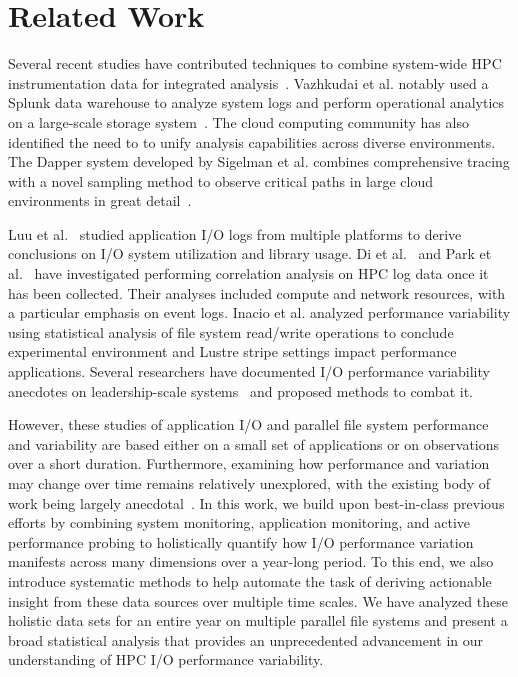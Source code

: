 \section{Related Work} \label{sec:related}

Several recent studies have contributed techniques to combine
system-wide HPC instrumentation data for integrated
analysis~\cite{Lockwood2017,Vazhkudai2017guide,Agelastos2014ldms,Kunkel2014siox,RIOT_2013}.
Vazhkudai et al. notably used a Splunk data warehouse to analyze system
logs and perform operational analytics on a large-scale storage system~\cite{Vazhkudai2017guide}.
The cloud computing community has also identified the need to to unify
analysis capabilities across diverse environments.
The Dapper system
developed by Sigelman et al. combines comprehensive tracing with a novel
sampling method to observe critical paths in large cloud environments in great
detail~\cite{Sigelman2010dapper}.

Luu et al.~\cite{Luu:2015:HPDC} studied application I/O logs from multiple platforms to derive conclusions on I/O system utilization and library usage.
Di et al.~\cite{7973730} and Park et al.~\cite{Park2017BigDM} have
investigated performing correlation analysis on HPC log data once it has been
collected.  Their analyses included compute and network resources, with a
particular emphasis on event logs. Inacio et al. analyzed performance variability using statistical analysis of file system read/write operations to conclude experimental environment and Lustre stripe settings impact performance applications. 
Several researchers have documented 
I/O performance variability anecdotes on leadership-scale
systems~\cite{Lofstead2010,Yildiz2016,carns2011understanding} and proposed
methods to combat it.  

However, these studies of application I/O and parallel file system performance and variability are based either on a small set of applications or on observations over a short duration.
Furthermore, examining how performance and variation may change over time remains relatively unexplored, with the existing body of work being largely anecdotal~\cite{Haryadi2018fail}.
In this work, we build upon best-in-class previous efforts by combining system monitoring, application monitoring, and active performance probing
to holistically quantify how I/O performance variation manifests across many dimensions over a year-long period.
To this end, we also introduce systematic methods to help automate the task of deriving actionable insight from these data sources over multiple time scales.
We have analyzed these holistic data sets for an entire year on multiple parallel file systems and present a broad statistical analysis that provides an unprecedented advancement in our understanding of HPC I/O performance variability.